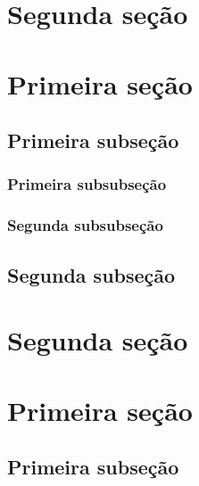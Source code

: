 \documentclass[a4paper,12pt,oneside,onecolumn]{uerj}
\begin{document}
\section{Segunda seção}


\annex


\section{Primeira seção}

\subsection{Primeira subseção}

\subsubsection{Primeira subsubseção}

\subsubsection{Segunda subsubseção}

\subsection{Segunda subseção}

\section{Segunda seção}


\section{Primeira seção}

\subsection{Primeira subseção}
\end{document}
